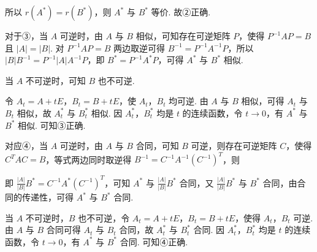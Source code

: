 

所以 $r(A^*)=r(B^*)$，则 $A^*$ 与 $B^*$ 等价. 故②正确.

对于③，当 $A$ 可逆时，由 $A$ 与 $B$ 相似，可知存在可逆矩阵 $P$，使得 $P^{-1}AP=B$ 且 $|A|=|B|$. 对 $P^{-1}AP=B$ 两边取逆可得 $B^{-1}=P^{-1}A^{-1}P$，所以 $|B|B^{-1}=P^{-1}|A|A^{-1}P$，即 $B^*=P^{-1}A^*P$，可得 $A^*$ 与 $B^*$ 相似.

当 $A$ 不可逆时，可知 $B$ 也不可逆.

令 $A_t=A+tE$，$B_t=B+tE$，使 $A_t$，$B_t$ 均可逆. 由 $A$ 与 $B$ 相似，可得 $A_t$ 与 $B_t$ 相似，故 $A_t^*$ 与 $B_t^*$ 相似. 因 $A_t^*$，$B_t^*$ 均是 $t$ 的连续函数，令 $t\to0$，有 $A^*$ 与 $B^*$ 相似. 可知③正确.

对应④，当 $A$ 可逆时，由 $A$ 与 $B$ 合同，可知 $B$ 可逆，则存在可逆矩阵 $C$，使得 $C^{T}AC=B$，等式两边同时取逆得 $B^{-1}=C^{-1}A^{-1}(C^{-1})^{T}$，则


即 $\frac{|A|}{|B|}B^*=C^{-1}A^*(C^{-1})^{T}$，可知 $A^*$ 与 $\frac{|A|}{|B|}B^*$ 合同，又 $\frac{|A|}{|B|}B^*$ 与 $B^*$ 合同，由合同的传递性，可得 $A^*$ 与 $B^*$ 合同.

当 $A$ 不可逆时，$B$ 也不可逆，令 $A_t=A+tE$，$B_t=B+tE$，使得 $A_t$，$B_t$ 可逆. 由 $A$ 与 $B$ 合同可得 $A_t$ 与 $B_t$ 合同，故 $A_t^*$ 与 $B_t^*$ 合同. 因 $A_t^*$，$B_t^*$ 均是 $t$ 的连续函数，令 $t\to0$，有 $A^*$ 与 $B^*$ 合同. 可知④正确.

